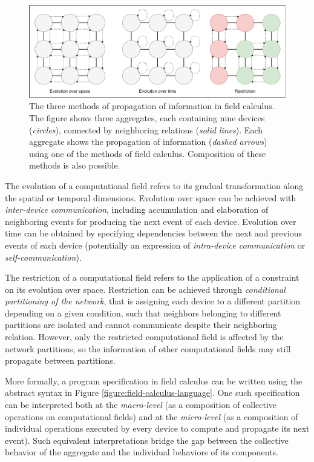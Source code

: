 \begin{figure}[!ht]
  \centering
  \includegraphics[width=1\textwidth]{resources/figures/information-propagation-in-field-calculus.pdf}
  \caption[Propagation of information in field calculus]{
    The three methods of propagation of information in field calculus. The figure
    shows three aggregates, each containing nine devices (\textit{circles}),
    connected by neighboring relations (\textit{solid lines}). Each
    aggregate shows the propagation of information (\textit{dashed arrows})
    using one of the methods of field calculus. Composition of these methods
    is also possible.
  }
  \label{figure:information-propagation-in-field-calculus}
\end{figure}

The evolution of a computational field refers to its gradual transformation
along the spatial or temporal dimensions. Evolution over space can be achieved
with \textit{inter-device communication}, including accumulation and
elaboration of neighboring events for producing the next event of each device.
Evolution over time can be obtained by specifying dependencies between the next
and previous events of each device (potentially an expression of
\textit{intra-device communication} or \textit{self-communication}).

The restriction of a computational field refers to the application of a
constraint on its evolution over space. Restriction can be achieved through
\textit{conditional partitioning of the network}, that is assigning each device
to a different partition depending on a given condition, such that neighbors
belonging to different partitions are isolated and cannot communicate despite
their neighboring relation. However, only the restricted computational field is
affected by the network partitions, so the information of other computational
fields may still propagate between partitions.

More formally, a program specification in field calculus can be written using
the abstract syntax in Figure \ref{figure:field-calculus-language}. One such
specification can be interpreted both at the \textit{macro-level} (as a
composition of collective operations on computational fields) and at the
\textit{micro-level} (as a composition of individual operations executed by
every device to compute and propagate its next event). Such equivalent
interpretations bridge the gap between the collective behavior of the aggregate
and the individual behaviors of its components.

